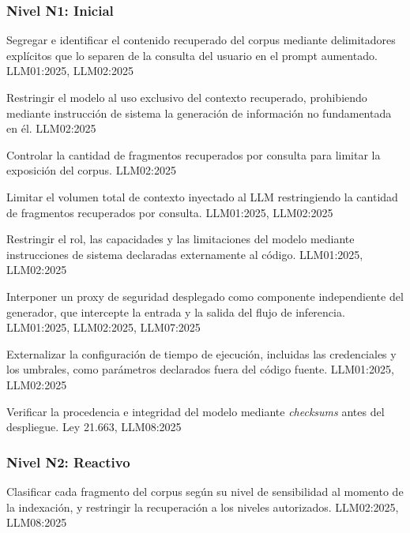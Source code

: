 \subsubsection*{Nivel N1: Inicial}

  {Segregar e identificar el contenido recuperado del corpus mediante delimitadores explícitos que lo separen de la consulta del usuario en el prompt aumentado.}
  {LLM01:2025, LLM02:2025}

  {Restringir el modelo al uso exclusivo del contexto recuperado, prohibiendo mediante instrucción de sistema la generación de información no fundamentada en él.}
  {LLM02:2025}

  {Controlar la cantidad de fragmentos recuperados por consulta para limitar la exposición del corpus.}
  {LLM02:2025}

  {Limitar el volumen total de contexto inyectado al LLM restringiendo la cantidad de fragmentos recuperados por consulta.}
  {LLM01:2025, LLM02:2025}

  {Restringir el rol, las capacidades y las limitaciones del modelo mediante instrucciones de sistema declaradas externamente al código.}
  {LLM01:2025, LLM02:2025}

  {Interponer un proxy de seguridad desplegado como componente independiente del generador, que intercepte la entrada y la salida del flujo de inferencia.}
  {LLM01:2025, LLM02:2025, LLM07:2025}

  {Externalizar la configuración de tiempo de ejecución, incluidas las credenciales y los umbrales, como parámetros declarados fuera del código fuente.}
  {LLM01:2025, LLM02:2025}

  {Verificar la procedencia e integridad del modelo mediante \textit{checksums} antes del despliegue.}
  {Ley 21.663, LLM08:2025}

\subsubsection*{Nivel N2: Reactivo}

  {Clasificar cada fragmento del corpus según su nivel de sensibilidad al momento de la indexación, y restringir la recuperación a los niveles autorizados.}
  {LLM02:2025, LLM08:2025}


